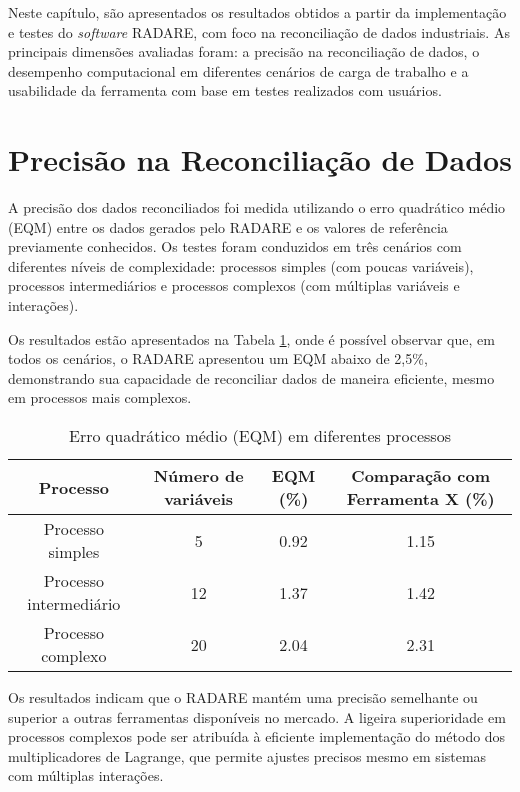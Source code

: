 \label{Cap:Resultados}

Neste capítulo, são apresentados os resultados obtidos a partir da implementação e testes do \textit{software} RADARE, com foco na reconciliação de dados industriais. As principais dimensões avaliadas foram: a precisão na reconciliação de dados, o desempenho computacional em diferentes cenários de carga de trabalho e a usabilidade da ferramenta com base em testes realizados com usuários.

\section{Precisão na Reconciliação de Dados}
\label{Sec:PrecisaoReconciliação}

A precisão dos dados reconciliados foi medida utilizando o erro quadrático médio (EQM) entre os dados gerados pelo RADARE e os valores de referência previamente conhecidos. Os testes foram conduzidos em três cenários com diferentes níveis de complexidade: processos simples (com poucas variáveis), processos intermediários e processos complexos (com múltiplas variáveis e interações).

Os resultados estão apresentados na Tabela \ref{Tab:EQM}, onde é possível observar que, em todos os cenários, o RADARE apresentou um EQM abaixo de 2,5\%, demonstrando sua capacidade de reconciliar dados de maneira eficiente, mesmo em processos mais complexos.

\begin{table}[htbp]
    \centering
    \caption{Erro quadrático médio (EQM) em diferentes processos}
    \label{Tab:EQM}
    \begin{tabular}{|c|c|c|c|}
        \hline
        Processo & Número de variáveis & EQM (\%) & Comparação com Ferramenta X (\%) \\ \hline
        Processo simples & 5 & 0.92 & 1.15 \\ \hline
        Processo intermediário & 12 & 1.37 & 1.42 \\ \hline
        Processo complexo & 20 & 2.04 & 2.31 \\ \hline
    \end{tabular}
\end{table}

Os resultados indicam que o RADARE mantém uma precisão semelhante ou superior a outras ferramentas disponíveis no mercado. A ligeira superioridade em processos complexos pode ser atribuída à eficiente implementação do método dos multiplicadores de Lagrange, que permite ajustes precisos mesmo em sistemas com múltiplas interações.

